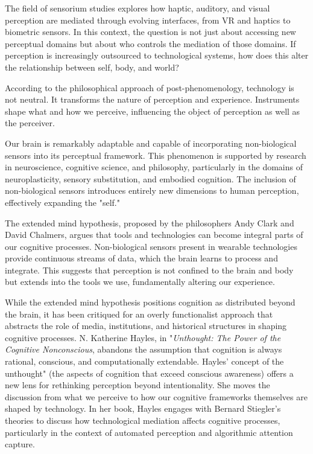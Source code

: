 
The field of sensorium studies explores how haptic, auditory, and visual perception are mediated through evolving interfaces, from VR and haptics to biometric sensors. In this context, the question is not just about accessing new perceptual domains but about who controls the mediation of those domains. If perception is increasingly outsourced to technological systems, how does this alter the relationship between self, body, and world?


According to the philosophical approach of post-phenomenology, technology is not neutral. It transforms the nature of perception and experience. Instruments shape what and how we perceive, influencing the object of perception as well as the perceiver.

Our brain is remarkably adaptable and capable of incorporating non-biological sensors into its perceptual framework. This phenomenon is supported by research in neuroscience, cognitive science, and philosophy, particularly in the domains of neuroplasticity, sensory substitution, and embodied cognition. The inclusion of non-biological sensors introduces entirely new dimensions to human perception, effectively expanding the "self."

The extended mind hypothesis, proposed by the philosophers Andy Clark and David Chalmers, argues that tools and technologies can become integral parts of our cognitive processes. Non-biological sensors present in wearable technologies provide continuous streams of data, which the brain learns to process and integrate. This suggests that perception is not confined to the brain and body but extends into the tools we use, fundamentally altering our experience.

While the extended mind hypothesis positions cognition as distributed beyond the brain, it has been critiqued for an overly functionalist approach that abstracts the role of media, institutions, and historical structures in shaping cognitive processes. N. Katherine Hayles, in "\textit{Unthought: The Power of the Cognitive Nonconscious}, abandons the assumption that cognition is always rational, conscious, and computationally extendable. Hayles' concept of the unthought" (the aspects of cognition that exceed conscious awareness) offers a new lens for rethinking perception beyond intentionality. She moves the discussion from what we perceive to how our cognitive frameworks themselves are shaped by technology. In her book, Hayles engages with Bernard Stiegler's theories to discuss how technological mediation affects cognitive processes, particularly in the context of automated perception and algorithmic attention capture.

